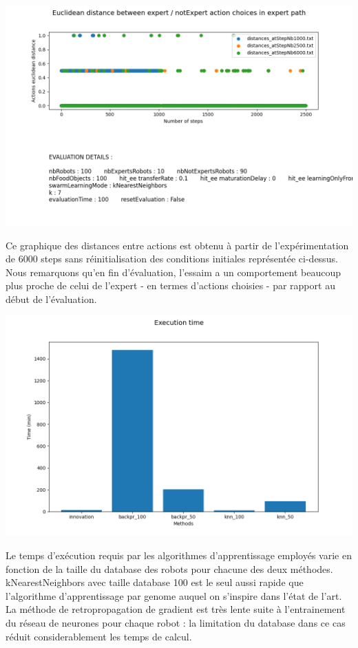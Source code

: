 \documentclass[a4paper, 12pt]{report}
\begin{document}
    

    
    \includegraphics[scale=0.5]{distances_knn.png}
    
    Ce graphique des distances entre actions est obtenu à partir de l'expérimentation de 6000 steps sans réinitialisation des conditions initiales représentée ci-dessus. Nous remarquons qu'en fin d'évaluation, l'essaim a un comportement beaucoup plus proche de celui de l'expert - en termes d'actions choisies - par rapport au début de l'évaluation.
    
    
    
    \includegraphics[scale=0.5]{images/executionTime.png}
    
    Le temps d'exécution requis par les algorithmes d'apprentissage employés varie en fonction de la taille du database des robots pour chacune des deux méthodes. kNearestNeighbors avec taille database 100 est le seul aussi rapide que l'algorithme d'apprentissage par genome auquel on s'inspire dans l'état de l'art. La méthode de retropropagation de gradient est très lente suite à l'entrainement du réseau de neurones pour chaque robot : la limitation du database dans ce cas réduit considerablement les temps de calcul.
    
\end{document}
